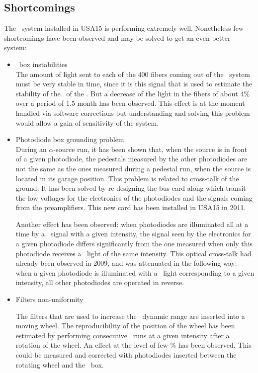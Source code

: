 \subsection{Shortcomings}
The \las~system installed in USA15 is performing extremely well. Nonetheless few shortcomings have been observed and may be solved to get an even better system:
\begin{itemize}
\item{\coimbra~box instabilities} \\
	
	The amount of light sent to each of the 400 fibers coming out of the \coimbra~system must be very stable in time, since it is this signal that is used to estimate the stability of the \pmts~of the \tilecal. But a decrease of the light in the fibers of about 4\% over a period of 1.5 month has been observed. This effect is at the moment handled via software corrections but understanding and solving this problem would allow a gain of sensitivity of the system.
	
\item{Photodiode box grounding problem} \\
	
	During an $\alpha$-source run, it has been shown that, when the source is in front of a given photodiode, the pedestals measured by the other photodiodes are not the same as the ones measured during a pedestal run, when the source is located in its garage position. This problem is related to cross-talk of the ground. It has been solved by re-designing the bus card along which transit the low voltages for the electronics of the photodiodes and the signals coming from the preamplifiers. This new card has been installed in USA15 in 2011. \par
	Another effect has been observed: when photodiodes are illuminated all at a time by a \las~signal with a given intensity, the signal seen by the electronics for a given photodiode differs significantly from the one measured when only this photodiode receives a \las~light of the same intensity. This optical cross-talk had already been observed in 2009, and was attenuated in the following way: when a given photodiode is illuminated with a \las~light corresponding to a given intensity, all other photodiodes are operated in reverse.
		
\item{Filters non-uniformity}
	
	The filters that are used to increase the \las~dynamic range are inserted into a moving wheel. The reproducibility of the position of the wheel has been estimated by performing consecutive \las~runs at a given intensity after a rotation of the wheel. An effect at the level of few \% has been observed. This could be measured and corrected with photodiodes inserted between the rotating wheel and the \coimbra~box.
	
\end{itemize}
